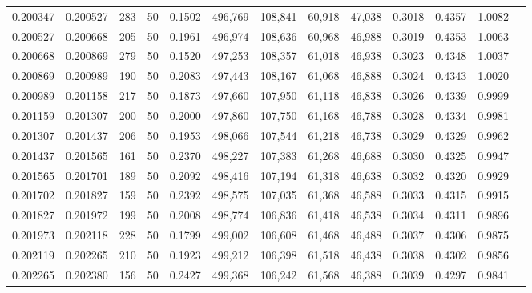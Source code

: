 \begin{tabular}{rrrrrrrrrrrrr}
0.200347 & 0.200527 &   283 &  50 &                                     0.1502 & 496,769 & 108,841 &  60,918 &  47,038 & 0.3018 & 0.4357 & 1.0082 \\
0.200527 & 0.200668 &   205 &  50 &                                     0.1961 & 496,974 & 108,636 &  60,968 &  46,988 & 0.3019 & 0.4353 & 1.0063 \\
0.200668 & 0.200869 &   279 &  50 &                                     0.1520 & 497,253 & 108,357 &  61,018 &  46,938 & 0.3023 & 0.4348 & 1.0037 \\
0.200869 & 0.200989 &   190 &  50 &                                     0.2083 & 497,443 & 108,167 &  61,068 &  46,888 & 0.3024 & 0.4343 & 1.0020 \\
0.200989 & 0.201158 &   217 &  50 &                                     0.1873 & 497,660 & 107,950 &  61,118 &  46,838 & 0.3026 & 0.4339 & 0.9999 \\
0.201159 & 0.201307 &   200 &  50 &                                     0.2000 & 497,860 & 107,750 &  61,168 &  46,788 & 0.3028 & 0.4334 & 0.9981 \\
0.201307 & 0.201437 &   206 &  50 &                                     0.1953 & 498,066 & 107,544 &  61,218 &  46,738 & 0.3029 & 0.4329 & 0.9962 \\
0.201437 & 0.201565 &   161 &  50 &                                     0.2370 & 498,227 & 107,383 &  61,268 &  46,688 & 0.3030 & 0.4325 & 0.9947 \\
0.201565 & 0.201701 &   189 &  50 &                                     0.2092 & 498,416 & 107,194 &  61,318 &  46,638 & 0.3032 & 0.4320 & 0.9929 \\
0.201702 & 0.201827 &   159 &  50 &                                     0.2392 & 498,575 & 107,035 &  61,368 &  46,588 & 0.3033 & 0.4315 & 0.9915 \\
0.201827 & 0.201972 &   199 &  50 &                                     0.2008 & 498,774 & 106,836 &  61,418 &  46,538 & 0.3034 & 0.4311 & 0.9896 \\
0.201973 & 0.202118 &   228 &  50 &                                     0.1799 & 499,002 & 106,608 &  61,468 &  46,488 & 0.3037 & 0.4306 & 0.9875 \\
0.202119 & 0.202265 &   210 &  50 &                                     0.1923 & 499,212 & 106,398 &  61,518 &  46,438 & 0.3038 & 0.4302 & 0.9856 \\
0.202265 & 0.202380 &   156 &  50 &                                     0.2427 & 499,368 & 106,242 &  61,568 &  46,388 & 0.3039 & 0.4297 & 0.9841 \\

\end{tabular}
